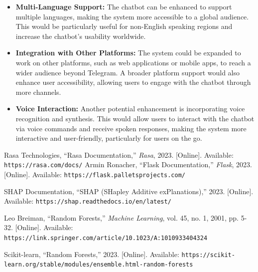 \documentclass[a4paper,12pt]{article}
\begin{document}
\begin{justify}
\begin{itemize}
	\item \textbf{Multi-Language Support:} The chatbot can be enhanced to support multiple languages, making the system more accessible to a global audience. This would be particularly useful for non-English speaking regions and increase the chatbot's usability worldwide.
	
	\item \textbf{Integration with Other Platforms:} The system could be expanded to work on other platforms, such as web applications or mobile apps, to reach a wider audience beyond Telegram. A broader platform support would also enhance user accessibility, allowing users to engage with the chatbot through more channels.
	
	\item \textbf{Voice Interaction:} Another potential enhancement is incorporating voice recognition and synthesis. This would allow users to interact with the chatbot via voice commands and receive spoken responses, making the system more interactive and user-friendly, particularly for users on the go.
\end{itemize}




\begin{thebibliography}{9}
	
	Rasa Technologies, ``Rasa Documentation,'' \textit{Rasa}, 2023. [Online]. Available: \texttt{https://rasa.com/docs/}
	Armin Ronacher, ``Flask Documentation,'' \textit{Flask}, 2023. [Online]. Available: \texttt{https://flask.palletsprojects.com/}
	
	SHAP Documentation, ``SHAP (SHapley Additive exPlanations),'' 2023. [Online]. Available: \texttt{https://shap.readthedocs.io/en/latest/}
	
	Leo Breiman, ``Random Forests,'' \textit{Machine Learning}, vol. 45, no. 1, 2001, pp. 5-32. [Online]. Available: \texttt{https://link.springer.com/article/10.1023/A:1010933404324}
	
	Scikit-learn, ``Random Forests,'' 2023. [Online]. Available: \texttt{https://scikit-learn.org/stable/modules/ensemble.html-random-forests}
	
\end{thebibliography}

\end{justify}
\end{document}
